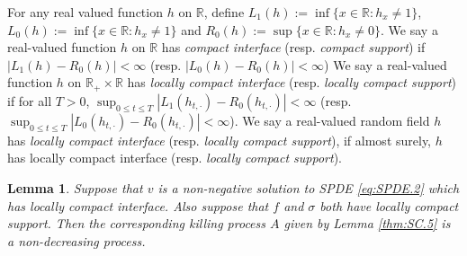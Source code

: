 \documentclass[12pt,a4paper]{amsart}
\numberwithin{equation}{section}
\theoremstyle{plain}
\newtheorem{lemma}[theorem]{Lemma}
\theoremstyle{remark}
\begin{document}
\subsubsection{}
For any real valued function $h$ on $\mathbb R$, define $L_1(h) := \inf \{x\in \mathbb R: h_x \neq 1\}$, $L_0(h):=\inf\{x\in \mathbb R: h_x \neq 1\}$ and $R_0(h) := \sup \{x\in \mathbb R: h_x \neq 0\}$.
We say a real-valued function $h$ on $\mathbb R$ has \emph{compact interface} (resp. \emph{compact support}) if $|L_1(h) - R_0(h)| < \infty$ (resp. $|L_0(h) - R_0(h)|<\infty$)
We say a real-valued function $h$ on $\mathbb R_+ \times \mathbb R$ has \emph{locally compact interface} (resp. \emph{locally compact support}) if  for all $T>0$, $\sup_{0\leq t\leq T}|L_1(h_{t,\cdot}) - R_0(h_{t,\cdot})| < \infty$ (resp. $\sup_{0\leq t\leq T}|L_0(h_{t,\cdot}) - R_0(h_{t,\cdot})| < \infty$). We say a real-valued random field $h$ has \emph{locally compact interface} (resp. \emph{locally compact support}), if almost surely, $h$ has locally compact interface (resp. \emph{locally compact support}).

\begin{lemma}
	Suppose that $v$ is a non-negative solution to SPDE \eqref{eq:SPDE.2} which has locally compact interface. 
	Also suppose that $f$ and $\sigma$ both have locally compact support.
	Then the corresponding killing process $A$ given by Lemma \ref{thm:SC.5} is a non-decreasing process.
\end{lemma}
\end{document}
